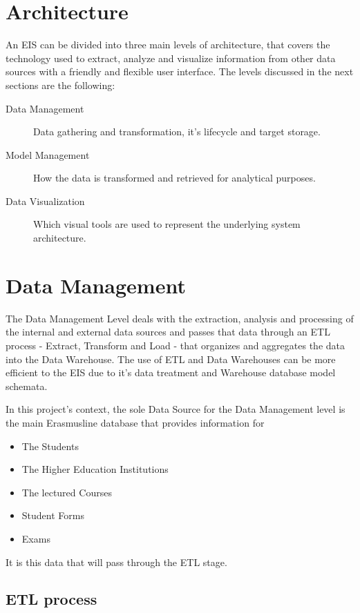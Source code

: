 \section{Architecture}
An EIS can be divided into three main levels of architecture\cite{eis:dlbi}, that
covers the technology used to extract, analyze and visualize information from other data
sources with a friendly and flexible user interface. The levels discussed in the
next sections are the following:

\begin{description}
  \item[Data Management] Data gathering and transformation, it's lifecycle and
  target storage.
  \item[Model Management] How the data is transformed and retrieved for
  analytical purposes.
  \item[Data Visualization] Which visual tools are used to represent the
  underlying system architecture.
\end{description}


\section{Data Management}

The Data Management Level deals with the extraction, analysis and processing of
the internal and external data sources and passes that data through an ETL
process - Extract, Transform and Load - that organizes and aggregates the data
into the Data Warehouse. The use of ETL and Data Warehouses can be more
efficient to the EIS due to it's data treatment and Warehouse database model
schemata.

In this project's context, the sole Data Source for the Data Management level is
the main Erasmusline database that provides information for 
\begin{itemize}
	\item The Students
	\item The Higher Education Institutions
	\item The lectured Courses
	\item Student Forms
	\item Exams
\end{itemize}

It is this data that will pass through the ETL stage.

\subsection{ETL process}

